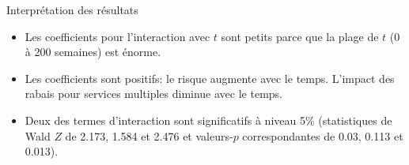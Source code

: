 \documentclass[
  ignorenonframetext,
]{beamer}
\providecommand{\tightlist}{%
  \setlength{\itemsep}{0pt}\setlength{\parskip}{0pt}}\usepackage{longtable,booktabs,array}
\begin{document}
\begin{frame}{Interprétation des résultats}
\protect\hypertarget{interpruxe9tation-des-ruxe9sultats}{}
\begin{itemize}
\tightlist
\item
  Les coefficients pour l'interaction avec \(t\) sont petits parce que
  la plage de \(t\) (0 à 200 semaines) est énorme.
\item
  Les coefficients sont positifs: le risque augmente avec le temps.
  L'impact des rabais pour services multiples diminue avec le temps.
\item
  Deux des termes d'interaction sont significatifs à niveau 5\%
  (statistiques de Wald \(Z\) de 2.173, 1.584 et 2.476 et valeurs-\(p\)
  correspondantes de 0.03, 0.113 et 0.013).
\end{itemize}
\end{frame}
\end{document}
